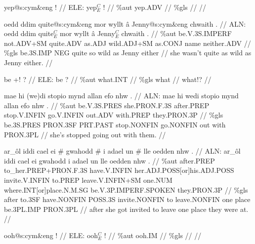 \documentclass[a4paper,10pt]{article}
\begin{document}
\ex
\begingl[lingstyle=gergl]
\glchat yep@s:cym\&eng ! //
\glsurface ELE:  yep$^{C}_{E}$ !  //
\glauto \%aut  yep{\scriptsize .ADV}   //
\glmanual \%gls     //
\gleng  //
\endgl
\xe

\ex
\begingl[lingstyle=gergl]
\glchat oedd ddim quite@s:cym\&eng mor wyllt â Jenny@s:cym\&eng chwaith . //
\glsurface ALN:  oedd ddim quite$^{C}_{E}$ mor wyllt â Jenny$^{C}_{E}$ chwaith .  //
\glauto \%aut  be{\scriptsize .V.3S.IMPERF} not{\scriptsize .ADV+SM} quite{\scriptsize .ADV} as{\scriptsize .ADJ} wild{\scriptsize .ADJ+SM} as{\scriptsize .CONJ} name neither{\scriptsize .ADV}   //
\glmanual \%gls  be{\scriptsize .3S.IMP} NEG quite so wild as Jenny either   //
\gleng she wasn't quite as wild as Jenny either. //
\endgl
\xe

\ex
\begingl[lingstyle=gergl]
\glchat be +! ? //
\glsurface ELE:  be ?  //
\glauto \%aut  what{\scriptsize .INT}   //
\glmanual \%gls  what   //
\gleng what!? //
\endgl
\xe

\ex
\begingl[lingstyle=gergl]
\glchat mae hi (we)di stopio mynd allan efo nhw . //
\glsurface ALN:  mae hi wedi stopio mynd allan efo nhw .  //
\glauto \%aut  be{\scriptsize .V.3S.PRES} she{\scriptsize .PRON.F.3S} after{\scriptsize .PREP} stop{\scriptsize .V.INFIN} go{\scriptsize .V.INFIN} out{\scriptsize .ADV} with{\scriptsize .PREP} they{\scriptsize .PRON.3P}   //
\glmanual \%gls  be{\scriptsize .3S.PRES} PRON{\scriptsize .3SF} PRT{\scriptsize .PAST} stop{\scriptsize .NONFIN} go{\scriptsize .NONFIN} out with PRON{\scriptsize .3PL}   //
\gleng she's stopped going out with them. //
\endgl
\xe

\ex
\begingl[lingstyle=gergl]
\glchat ar\_ôl iddi cael ei \# gwahodd \# i adael un \# lle oedden nhw . //
\glsurface ALN:  ar\_ôl iddi cael ei gwahodd i adael un lle oedden nhw .  //
\glauto \%aut  after{\scriptsize .PREP} to\_her{\scriptsize .PREP+PRON.F.3S} have{\scriptsize .V.INFIN} her{\scriptsize .ADJ.POSS[or]his.ADJ.POSS} invite{\scriptsize .V.INFIN} to{\scriptsize .PREP} leave{\scriptsize .V.INFIN+SM} one{\scriptsize .NUM} where{\scriptsize .INT[or]place.N.M.SG} be{\scriptsize .V.3P.IMPERF.SPOKEN} they{\scriptsize .PRON.3P}   //
\glmanual \%gls  after to{\scriptsize .3SF} have{\scriptsize .NONFIN} POSS{\scriptsize .3S} invite{\scriptsize .NONFIN} to leave{\scriptsize .NONFIN} one place be{\scriptsize .3PL.IMP} PRON{\scriptsize .3PL}   //
\gleng after she got invited to leave one place they were at. //
\endgl
\xe

\ex
\begingl[lingstyle=gergl]
\glchat ooh@s:cym\&eng ! //
\glsurface ELE:  ooh$^{C}_{E}$ !  //
\glauto \%aut  ooh{\scriptsize .IM}   //
\glmanual \%gls     //
\gleng  //
\endgl
\xe
\end{document}
